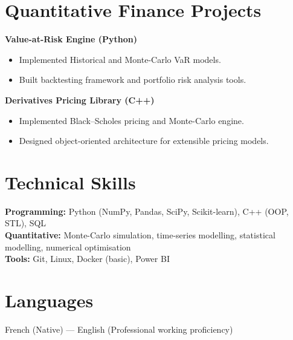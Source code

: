 \documentclass[10pt, letterpaper]{article}
\begin{document}
\section*{Quantitative Finance Projects}
\textbf{Value-at-Risk Engine (Python)}
\begin{itemize}[leftmargin=0.5cm]
\item Implemented Historical and Monte-Carlo VaR models.
\item Built backtesting framework and portfolio risk analysis tools.
\end{itemize}

\textbf{Derivatives Pricing Library (C++)}
\begin{itemize}[leftmargin=0.5cm]
\item Implemented Black--Scholes pricing and Monte-Carlo engine.
\item Designed object-oriented architecture for extensible pricing models.
\end{itemize}

\section*{Technical Skills}
\textbf{Programming:} Python (NumPy, Pandas, SciPy, Scikit-learn), C++ (OOP, STL), SQL\\
\textbf{Quantitative:} Monte-Carlo simulation, time-series modelling, statistical modelling, numerical optimisation\\
\textbf{Tools:} Git, Linux, Docker (basic), Power BI

\section*{Languages}
French (Native) --- English (Professional working proficiency)
\end{document}
